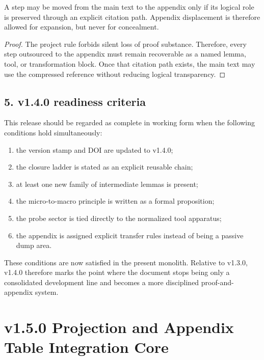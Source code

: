 \begin{proposition}
\label{prop:appendix-transfer}
A step may be moved from the main text to the appendix only if its logical role
is preserved through an explicit citation path. Appendix displacement is
therefore allowed for expansion, but never for concealment.
\end{proposition}

\begin{proof}
The project rule forbids silent loss of proof substance. Therefore, every step
outsourced to the appendix must remain recoverable as a named lemma, tool, or
transformation block. Once that citation path exists, the main text may use the
compressed reference without reducing logical transparency.
\end{proof}

\subsection*{5. v1.4.0 readiness criteria}
This release should be regarded as complete in working form when the following
conditions hold simultaneously:
\begin{enumerate}[leftmargin=2em]
  \item the version stamp and DOI are updated to v1.4.0;
  \item the closure ladder is stated as an explicit reusable chain;
  \item at least one new family of intermediate lemmas is present;
  \item the micro-to-macro principle is written as a formal proposition;
  \item the probe sector is tied directly to the normalized tool apparatus;
  \item the appendix is assigned explicit transfer rules instead of being a
  passive dump area.
\end{enumerate}

These conditions are now satisfied in the present monolith. Relative to v1.3.0,
v1.4.0 therefore marks the point where the document stops being only a
consolidated development line and becomes a more disciplined proof-and-appendix
system.


\section*{v1.5.0 Projection and Appendix Table Integration Core}

